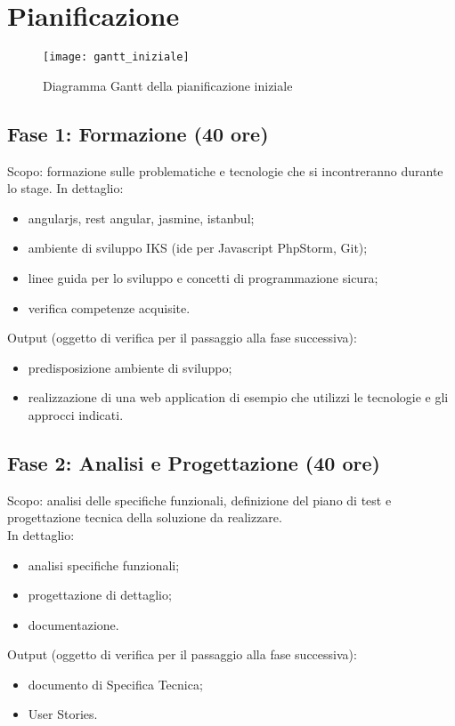 \section{Pianificazione}

\begin{figure}[H] 
    \centering 
    \texttt{[image: gantt\_iniziale]} 
    \caption{Diagramma Gantt della pianificazione iniziale}
\end{figure}

\subsection{Fase 1: Formazione (40 ore)}
Scopo: formazione sulle problematiche e tecnologie che si incontreranno durante lo stage.
In dettaglio:
\begin{itemize}
	\item angularjs, rest angular, jasmine, istanbul;
	\item ambiente di sviluppo IKS (\gls{ide} per Javascript PhpStorm, Git);
	\item linee guida per lo sviluppo e concetti di programmazione sicura;
	\item verifica competenze acquisite.
\end{itemize}
Output (oggetto di verifica per il passaggio alla fase successiva):
\begin{itemize}
	\item predisposizione ambiente di sviluppo;
	\item realizzazione di una web application di esempio che utilizzi le tecnologie e gli approcci
indicati.
\end{itemize}

\subsection{Fase 2: Analisi e Progettazione (40 ore)}
Scopo: analisi delle specifiche funzionali, definizione del piano di test e progettazione tecnica
della soluzione da realizzare.\\
In dettaglio:
\begin{itemize}
	\item analisi specifiche funzionali;
	\item progettazione di dettaglio;
	\item documentazione.
\end{itemize}
Output (oggetto di verifica per il passaggio alla fase successiva):
\begin{itemize}
	\item documento di Specifica Tecnica;
	\item User Stories.
\end{itemize}

